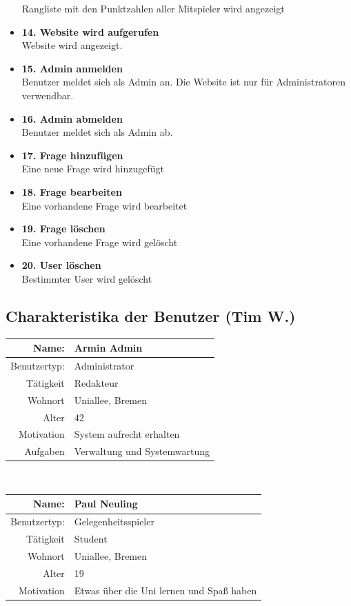 \documentclass[fontsize=12pt,paper=a4,twoside]{scrartcl}
\begin{document}
\begin{itemize}
	Rangliste mit den Punktzahlen aller Mitspieler wird angezeigt
	\item \textbf{14. Website wird aufgerufen}\\
	Website wird angezeigt.
	\item \textbf{15. Admin anmelden}\\
	Benutzer meldet sich als Admin an. Die Website ist nur für Administratoren verwendbar.
	\item \textbf{16. Admin abmelden}\\
	Benutzer meldet sich als Admin ab.
	\item \textbf{17. Frage hinzufügen}\\
	Eine neue Frage wird hinzugefügt
	\item \textbf{18. Frage bearbeiten}\\
	Eine vorhandene Frage wird bearbeitet
	\item \textbf{19. Frage löschen}\\
	Eine vorhandene Frage wird gelöscht
	\item \textbf{20. User löschen}\\
	Bestimmter User wird gelöscht
\end{itemize}

\subsection{Charakteristika der Benutzer (Tim W.)}
	\begin{tabular}{|r|l|}\hline
       Name: & Armin Admin\\\hline
       Benutzertyp: & Administrator\\\hline
       Tätigkeit	& Redakteur\\\hline
       Wohnort & Uniallee, Bremen\\\hline
       Alter	 & 42\\\hline
       Motivation & System aufrecht erhalten\\\hline
       Aufgaben & Verwaltung und Systemwartung\\\hline
    \end{tabular}\\
        
    	\begin{tabular}{|r|l|}\hline
       Name: & Paul Neuling\\\hline
       Benutzertyp: & Gelegenheitsspieler \\\hline
       Tätigkeit	& Student\\\hline
       Wohnort & Uniallee, Bremen\\\hline
       Alter	 & 19\\\hline
       Motivation & Etwas über die Uni lernen und Spaß haben\\\hline
    \end{tabular}\\
    
\end{document}
